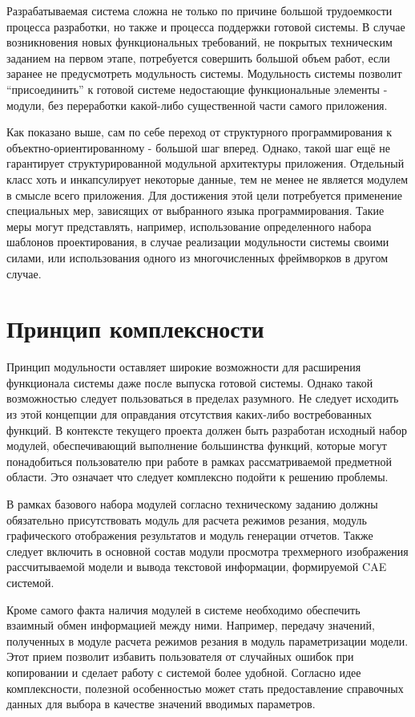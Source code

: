 \documentclass[14pt,oneside,final]{extreport}
\begin{document}
	Разрабатываемая система сложна не только по причине большой трудоемкости процесса разработки, но также и процесса поддержки готовой системы. В случае возникновения новых функциональных требований, не покрытых техническим заданием на первом этапе, потребуется совершить большой объем работ, если заранее не предусмотреть модульность системы. Модульность системы позволит “присоединить” к готовой системе недостающие функциональные элементы - модули, без переработки какой-либо существенной части самого приложения. 
	
	Как показано выше, сам по себе переход от структурного программирования к объектно-ориентированному - большой шаг вперед. Однако, такой шаг ещё не гарантирует структурированной модульной архитектуры приложения. Отдельный класс хоть и инкапсулирует некоторые данные, тем не менее не является модулем в смысле всего приложения. Для достижения этой цели потребуется применение специальных мер, зависящих от выбранного языка программирования. Такие меры могут представлять, например, использование определенного набора шаблонов проектирования, в случае реализации модульности системы своими силами, или использования одного из многочисленных фреймворков в другом случае.  

	
	
	\section{Принцип комплексности}
	Принцип модульности оставляет широкие возможности для расширения функционала системы даже после выпуска готовой системы. Однако такой возможностью следует пользоваться в пределах разумного. Не следует исходить из этой концепции для оправдания отсутствия каких-либо востребованных функций. В контексте текущего проекта должен быть разработан исходный набор модулей, обеспечивающий выполнение большинства функций, которые могут понадобиться пользователю при работе в рамках рассматриваемой предметной области. Это означает что следует комплексно подойти к решению проблемы. 
	    
	В рамках базового набора модулей согласно техническому заданию должны обязательно присутствовать модуль для расчета режимов резания, модуль графического отображения результатов и модуль генерации отчетов. Также следует включить в основной состав модули просмотра трехмерного изображения рассчитываемой модели и вывода текстовой информации, формируемой CAE системой. 
	    
	Кроме самого факта наличия модулей в системе необходимо обеспечить взаимный обмен информацией между ними. Например, передачу значений, полученных в модуле расчета режимов резания в модуль параметризации модели. Этот прием позволит избавить пользователя от случайных ошибок при копировании и сделает работу с системой более удобной. Согласно идее комплексности, полезной особенностью может стать предоставление справочных данных для выбора в качестве значений вводимых параметров. 
	    
\end{document}
